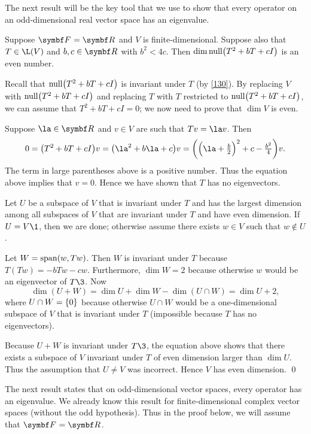 The next result will be the key tool that we use to show that every operator on an odd-dimensional real vector space has an eigenvalue.

{Suppose $\F{} = \R{}$ and $V$ is finite-dimensional. Suppose also that $T \in \L(V)$ and $b, c \in \R{}$ with $b^2 < 4c$. Then
$\dim \ker \paren[\big]{T^2 + bT + cI}$ is an even number.}

\proof
Recall that $\ker \paren[\big]{T^2 + bT + cI}$ is invariant under $T$ (by \ref{130}). By replacing $V$ with $\ker \paren[\big]{T^2 + bT + cI}$ and replacing $T$ with $T$ restricted to $\ker \paren[\big]{T^2 + bT + cI}$, we can assume that
$
T^2 + bT + cI = 0$;
we now need to prove that $\dim V$ is even.

Suppose $\la \in \R{}$ and $v \in V$ are such that $Tv = \la v$. Then
\[
0 = \paren[\big]{T^2 + bT + cI} v = \paren[\big]{\la^2 + b \la + c} v = \paren[\bigg]{\paren[\Big]{\la + \tfrac{b}{2}}^2 + c - \tfrac{b^2}{4}} v.
\]
The term in large parentheses above is a positive number. Thus the equation above implies that $v = 0$. Hence we have shown that $T$ has no eigenvectors.

Let $U$ be a subspace of $V$ that is invariant under $T$ and has the largest dimension among all subspaces of $V$ that are invariant under $T$ and have even dimension. If $U = V\1$, then we are done; otherwise assume there exists $w \in V$ such that
$w \notin U$.

Let $W = \Span(w, Tw)$. Then $W$ is invariant under $T$ because $T(Tw) = -bTw - cw$. Furthermore, $\dim W = 2$ because otherwise $w$ would be an eigenvector of $T\3$. Now
\[
\dim(U + W) = \dim U + \dim W - \dim(U \cap W) = \dim U + 2,
\]
where $U \cap W = \br{0}$ because otherwise $U \cap W$ would be a one-dimensional subspace of $V$ that is invariant under $T$ (impossible because $T$ has no eigenvectors).

Because $U + W$ is invariant under $T\3$, the equation above shows that there exists a subspace of $V$ invariant under $T$ of even dimension larger than $\dim U$. Thus the assumption that $U \ne V$ was incorrect. Hence $V$ has even dimension.
\qed

\pagebreak[3]

The next result states that on odd-dimensional vector spaces, every operator has an eigenvalue. We already know this result for finite-dimensional complex vector spaces (without the odd hypothesis). Thus in the proof below, we will assume that $\F{} = \R{}$.

